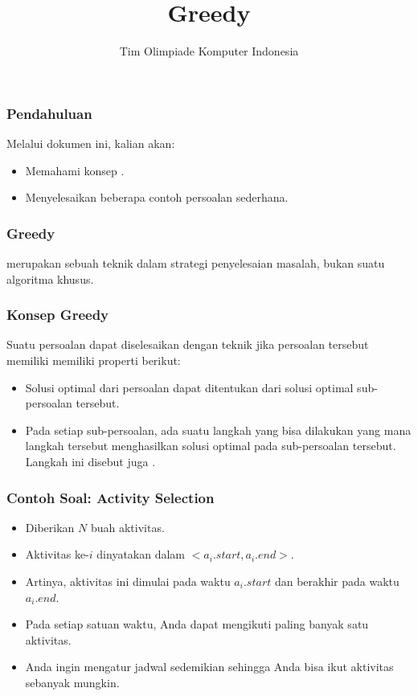  

\title{Greedy}
\author{Tim Olimpiade Komputer Indonesia}
\date{}



\begin{frame}
  \titlepage
\end{frame}

\begin{frame}
  \frametitle{Pendahuluan}
  Melalui dokumen ini, kalian akan:
  \begin{itemize}
    \item Memahami konsep \fGreedy.
    \item Menyelesaikan beberapa contoh persoalan \fGreedy sederhana.
  \end{itemize}
\end{frame}

\begin{frame}
  \frametitle{Greedy}
  \begin{center}
    \fGreedy merupakan sebuah teknik dalam strategi penyelesaian masalah, bukan suatu algoritma khusus.
  \end{center}
\end{frame}

\begin{frame}
  \frametitle{Konsep Greedy}
  Suatu persoalan dapat diselesaikan dengan teknik \fGreedy jika persoalan tersebut memiliki memiliki properti berikut:
  \begin{itemize}
    \item Solusi optimal dari persoalan dapat ditentukan dari solusi optimal sub-persoalan tersebut.
    \item Pada setiap sub-persoalan, ada suatu langkah yang bisa dilakukan yang mana langkah tersebut menghasilkan solusi optimal pada sub-persoalan tersebut. Langkah ini disebut juga \fGreedyChoice.
  \end{itemize}
\end{frame}

\begin{frame}
  \frametitle{Contoh Soal: Activity Selection}
  \begin{itemize}
    \item Diberikan $N$ buah aktivitas.
    \item Aktivitas ke-$i$ dinyatakan dalam $<a_i.start, a_i.end>$.
    \item Artinya, aktivitas ini dimulai pada waktu $a_i.start$ dan berakhir pada waktu $a_i.end$.
    \item Pada setiap satuan waktu, Anda dapat mengikuti paling banyak satu aktivitas.
    \item Anda ingin mengatur jadwal sedemikian sehingga Anda bisa ikut aktivitas sebanyak mungkin.
  \end{itemize}
\end{frame}

